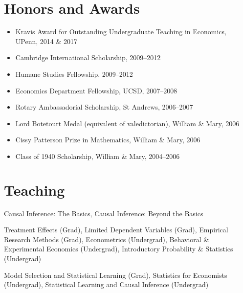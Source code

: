 \documentclass[line,overlapped]{myres}
\begin{document}
\begin{resume}


\section{\sc Honors and Awards}
\vspace{1em}
\begin{itemize}
\item Kravis Award for Outstanding Undergraduate Teaching in Economics, UPenn, 2014 \& 2017
\item Cambridge International Scholarship, 2009--2012
\item Humane Studies Fellowship, 2009--2012
\item Economics Department Fellowship, UCSD, 2007--2008
\item Rotary Ambassadorial Scholarship, St Andrews, 2006--2007
\item Lord Botetourt Medal (equivalent of valedictorian), William \& Mary, 2006
\item Cissy Patterson Prize in Mathematics, William \& Mary, 2006
\item Class of 1940 Scholarship, William \& Mary, 2004--2006
\end{itemize}

\section{\sc Teaching }
\begin{description}[style=multiline,leftmargin=3cm,font=\normalfont]
  \item[Short Courses:] Causal Inference: The Basics, Causal Inference: Beyond the Basics
  \item[Oxford:] Treatment Effects (Grad), Limited Dependent Variables (Grad), Empirical Research Methods (Grad), Econometrics (Undergrad), Behavioral \& Experimental Economics (Undergrad), Introductory Probability \& Statistics (Undergrad)
  \item[UPenn:] Model Selection and Statistical Learning (Grad), Statistics for Economists (Undergrad), Statistical Learning and Causal Inference (Undergrad)
\end{description}



\end{resume}
\end{document}
